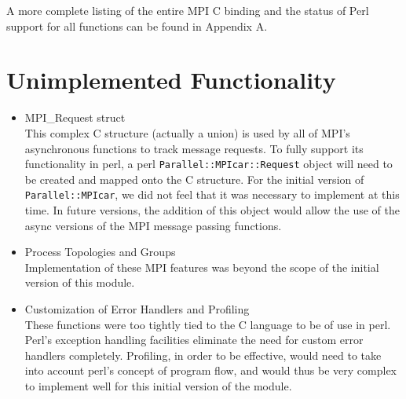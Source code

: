 \documentclass{report}
\begin{document}
A more complete listing of the entire MPI C binding and the status of
Perl support for all functions can be found in Appendix A.

\section*{Unimplemented Functionality}

\begin{itemize}
\item MPI\_Request struct\\
	This complex C structure (actually a union) is used by all of
MPI's asynchronous functions to track message requests.  To fully
support its functionality in perl, a perl
\verb|Parallel::MPIcar::Request| object will need to be created and
mapped onto the C structure.  For the initial version of
\verb|Parallel::MPIcar|, we did not feel that it was necessary to
implement at this time.  In future versions, the addition of this
object would allow the use of the async versions of the MPI message
passing functions.

\item Process Topologies and Groups\\
	Implementation of these MPI features was beyond the scope of
the initial version of this module.

\item Customization of Error Handlers and Profiling\\
	These functions were too tightly tied to the C language to be
of use in perl.  Perl's exception handling facilities eliminate the
need for custom error handlers completely.  Profiling, in order to be
effective, would need to take into account perl's concept of program
flow, and would thus be very complex to implement well for this 
initial version of the module.
	
\end{itemize}

\end{document}
